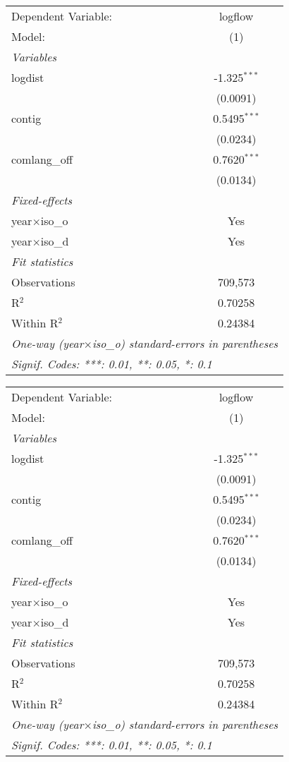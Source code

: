 \begin{tabular}{lc}
\tabularnewline\toprule\toprule
Dependent Variable:&logflow\\
Model:&(1)\\
\midrule
\emph{Variables}&  \\
logdist&-1.325$^{***}$\\
  &(0.0091)\\
contig&0.5495$^{***}$\\
  &(0.0234)\\
comlang\_off&0.7620$^{***}$\\
  &(0.0134)\\
\midrule
\emph{Fixed-effects}&  \\
year$\times$iso\_o&Yes\\
year$\times$iso\_d&Yes\\
\midrule
\emph{Fit statistics}&  \\
Observations& 709,573\\
R$^2$ & 0.70258\\
Within R$^2$ & 0.24384\\
\bottomrule\bottomrule
\multicolumn{2}{l}{\emph{One-way (year$\times$iso\_o) standard-errors in parentheses}}\\
\multicolumn{2}{l}{\emph{Signif. Codes: ***: 0.01, **: 0.05, *: 0.1}}\\
\end{tabular}
\begin{tabular}{lc}
\tabularnewline\toprule\toprule
Dependent Variable:&logflow\\
Model:&(1)\\
\midrule
\emph{Variables}&  \\
logdist&-1.325$^{***}$\\
  &(0.0091)\\
contig&0.5495$^{***}$\\
  &(0.0234)\\
comlang\_off&0.7620$^{***}$\\
  &(0.0134)\\
\midrule
\emph{Fixed-effects}&  \\
year$\times$iso\_o&Yes\\
year$\times$iso\_d&Yes\\
\midrule
\emph{Fit statistics}&  \\
Observations& 709,573\\
R$^2$ & 0.70258\\
Within R$^2$ & 0.24384\\
\bottomrule\bottomrule
\multicolumn{2}{l}{\emph{One-way (year$\times$iso\_o) standard-errors in parentheses}}\\
\multicolumn{2}{l}{\emph{Signif. Codes: ***: 0.01, **: 0.05, *: 0.1}}\\
\end{tabular}
